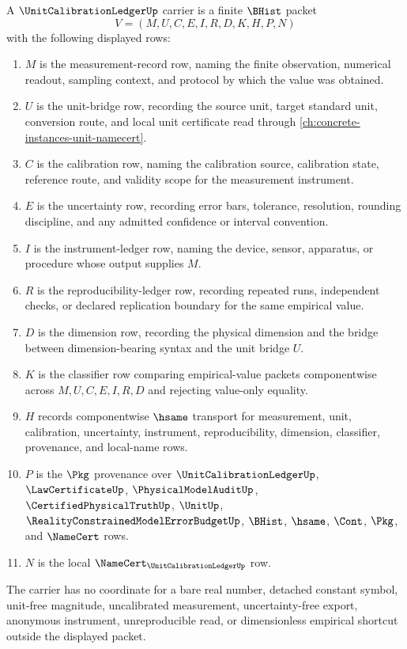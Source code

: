 \begin{definition}
\label{def:unit-calibration-ledger-carrier}
A $\UnitCalibrationLedgerUp$ carrier is a finite $\BHist$ packet
$$
V=(M,U,C,E,I,R,D,K,H,P,N)
$$
with the following displayed rows:
\begin{enumerate}
\item $M$ is the measurement-record row, naming the finite observation, numerical readout, sampling context, and protocol by which the value was obtained.
\item $U$ is the unit-bridge row, recording the source unit, target standard unit, conversion route, and local unit certificate read through \autoref{ch:concrete-instances-unit-namecert}.
\item $C$ is the calibration row, naming the calibration source, calibration state, reference route, and validity scope for the measurement instrument.
\item $E$ is the uncertainty row, recording error bars, tolerance, resolution, rounding discipline, and any admitted confidence or interval convention.
\item $I$ is the instrument-ledger row, naming the device, sensor, apparatus, or procedure whose output supplies $M$.
\item $R$ is the reproducibility-ledger row, recording repeated runs, independent checks, or declared replication boundary for the same empirical value.
\item $D$ is the dimension row, recording the physical dimension and the bridge between dimension-bearing syntax and the unit bridge $U$.
\item $K$ is the classifier row comparing empirical-value packets componentwise across $M,U,C,E,I,R,D$ and rejecting value-only equality.
\item $H$ records componentwise $\hsame$ transport for measurement, unit, calibration, uncertainty, instrument, reproducibility, dimension, classifier, provenance, and local-name rows.
\item $P$ is the $\Pkg$ provenance over $\UnitCalibrationLedgerUp$, $\LawCertificateUp$, $\PhysicalModelAuditUp$, $\CertifiedPhysicalTruthUp$, $\UnitUp$, $\RealityConstrainedModelErrorBudgetUp$, $\BHist$, $\hsame$, $\Cont$, $\Pkg$, and $\NameCert$ rows.
\item $N$ is the local $\NameCert_{\UnitCalibrationLedgerUp}$ row.
\end{enumerate}
The carrier has no coordinate for a bare real number, detached constant symbol, unit-free magnitude, uncalibrated measurement, uncertainty-free export, anonymous instrument, unreproducible read, or dimensionless empirical shortcut outside the displayed packet.
\end{definition}

